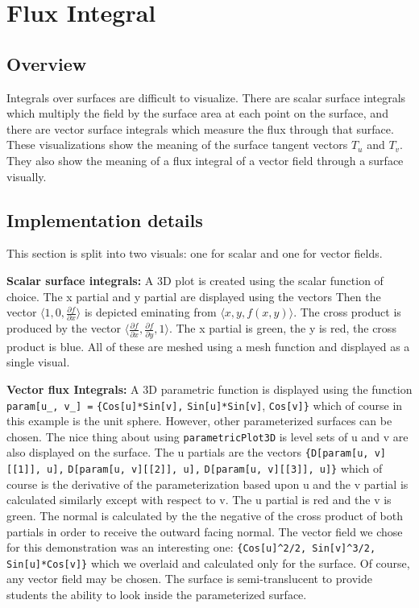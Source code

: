 \section{Flux Integral}

\subsection*{Overview}

Integrals over surfaces are difficult to visualize. There are scalar surface integrals which multiply the field by the surface area at each point on the surface, and there are vector surface integrals which measure the flux through that surface. These visualizations show the meaning of the surface tangent vectors \(T_u\) and \(T_v\). They also show the meaning of a flux integral of a vector field through a surface visually.

\subsection*{Implementation details}

This section is split into two visuals: one for scalar and one for vector fields. 

\textbf{Scalar surface integrals:} A 3D  plot is created using the scalar function of choice. The x partial and y partial are displayed using the vectors Then the vector $\langle 1, 0, \frac{\partial f}{\partial x} \rangle$ is depicted eminating from $\langle x, y, f(x, y) \rangle$. The cross product is produced by the vector $\langle \frac{\partial f}{\partial x}, \frac{\partial f}{\partial y}, 1 \rangle$. The x partial is green, the y is red, the cross product is blue. All of these are meshed using a mesh function and displayed as a single visual. \cite{flux8}

\textbf{Vector flux Integrals:} A 3D parametric function is displayed using the function \verb+param[u_, v_] =+ \verb+{Cos[u]*Sin[v],+ \verb+Sin[u]*Sin[v]+, \verb+Cos[v]}+ which of course in this example is the unit sphere. However, other parameterized surfaces can be chosen. The nice thing about using \verb+parametricPlot3D+ is level sets of u and v are also displayed on the surface. The u partials are the vectors \verb+{D[param[u, v][[1]], u],+ \verb+D[param[u, v][[2]], u],+ \verb+D[param[u, v][[3]], u]}+ which of course is the derivative of the parameterization based upon u and the v partial is calculated similarly except with respect to v. The u partial is red and the v is green. The normal is calculated by the the negative of the cross product of both partials in order to receive the outward facing normal. The vector field we chose for this demonstration was an interesting one: \verb+{Cos[u]^2/2, Sin[v]^3/2, Sin[u]*Cos[v]}+ which we overlaid and calculated only for the surface. Of course, any vector field may be chosen. The surface is semi-translucent to provide students the ability to look inside the parameterized surface. \cite{flux7}

